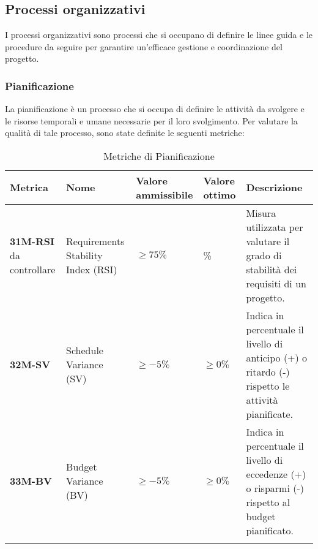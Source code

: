 \subsection{Processi organizzativi}
I processi organizzativi sono processi che si occupano di definire le linee guida e le procedure da seguire per garantire
un'efficace gestione e coordinazione del progetto.

\subsubsection{Pianificazione}
La pianificazione è un processo che si occupa di definire le attività da svolgere e le risorse temporali e umane necessarie
per il loro svolgimento. Per valutare la qualità di tale processo, sono state definite le seguenti metriche:
\begin{longtable}{|>{\raggedright\arraybackslash}m{}|>{\raggedright\arraybackslash}m{}|>{\raggedright\arraybackslash}m{}|>{\raggedright\arraybackslash}m{}|>{\raggedright\arraybackslash}m{}|}
	\hline
	\textbf{Metrica} & \textbf{Nome} & \textbf{Valore ammissibile} & \textbf{Valore ottimo} & \textbf{Descrizione}\\
	\hline
	\endfirsthead
	\hline
	\textbf{31M-RSI} da controllare & Requirements Stability Index (RSI) & $\geq 75\% $ & 100\% & Misura utilizzata per valutare il grado di stabilità dei requisiti di un progetto.\\
	\hline
	\textbf{32M-SV} & Schedule Variance (SV) & $\geq -5\%$ & $\geq 0\%$ & Indica in percentuale il livello di anticipo (+) o ritardo (-) rispetto le attività pianificate.\\
	\hline
	\textbf{33M-BV} & Budget Variance (BV) & $\geq -5\%$ & $\geq 0\%$ & Indica in percentuale il livello di eccedenze (+) o risparmi (-) rispetto al budget pianificato.\\
	\hline
	\caption{Metriche di Pianificazione}
	\label{table:11}
\end{longtable}
